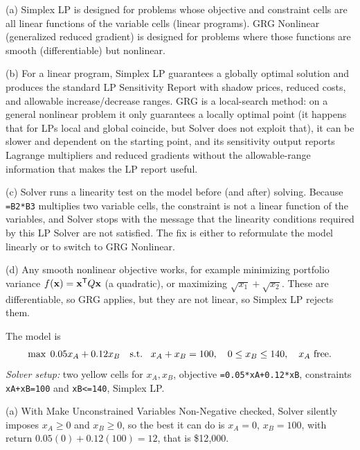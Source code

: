 
(a) Simplex LP is designed for problems whose objective and constraint cells are all linear functions of the variable cells (linear programs). GRG Nonlinear (generalized reduced gradient) is designed for problems where those functions are smooth (differentiable) but nonlinear.

(b) For a linear program, Simplex LP guarantees a globally optimal solution and produces the standard LP Sensitivity Report with shadow prices, reduced costs, and allowable increase/decrease ranges. GRG is a local-search method: on a general nonlinear problem it only guarantees a locally optimal point (it happens that for LPs local and global coincide, but Solver does not exploit that), it can be slower and dependent on the starting point, and its sensitivity output reports Lagrange multipliers and reduced gradients without the allowable-range information that makes the LP report useful.

(c) Solver runs a linearity test on the model before (and after) solving. Because \texttt{=B2*B3} multiplies two variable cells, the constraint is not a linear function of the variables, and Solver stops with the message that the linearity conditions required by this LP Solver are not satisfied. The fix is either to reformulate the model linearly or to switch to GRG Nonlinear.

(d) Any smooth nonlinear objective works, for example minimizing portfolio variance $f(\mathbf{x}) = \mathbf{x}^{\mathsf T} Q \mathbf{x}$ (a quadratic), or maximizing $\sqrt{x_1} + \sqrt{x_2}$. These are differentiable, so GRG applies, but they are not linear, so Simplex LP rejects them.


The model is
\[
\max \; 0.05x_A + 0.12x_B \quad \text{s.t.}\;\; \; x_A + x_B = 100, \quad 0 \leq x_B \leq 140, \quad x_A \text{ free}.
\]
\emph{Solver setup:} two yellow cells for $x_A, x_B$, objective \texttt{=0.05*xA+0.12*xB}, constraints \texttt{xA+xB=100} and \texttt{xB<=140}, Simplex LP.

(a) With Make Unconstrained Variables Non-Negative checked, Solver silently imposes $x_A \geq 0$ and $x_B \geq 0$, so the best it can do is $x_A = 0$, $x_B = 100$, with return $0.05(0) + 0.12(100) = 12$, that is \$12{,}000.

